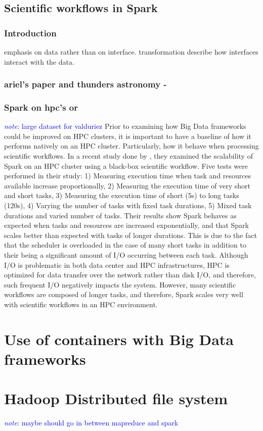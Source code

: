 \documentclass{report}
\newcommand{\note}[1]{\textcolor{blue}{\textit{note}: #1}}
\begin{document}
    \subsection{Scientific workflows in Spark} \subsubsection{Introduction}
    emphasis on data rather than on interface. transformation describe how
    interfaces interact with the data.  \subsubsection{ariel's paper and
    thunders astronomy - } \subsubsection{Spark on hpc's or } \note{large
    dataset for valduriez} Prior to examining how Big Data frameworks could be
    improved on HPC clusters, it is important to have a baseline of how it
    performs natively on an HPC cluster.  Particularly, how it behave when
    processing scientific workflows. In a recent study done by \cite{valduriez},
    they examined the scalability of Spark on an HPC cluster using a black-box
    scientific workflow. Five tests were performed in their study: 1) Measuring
    execution time when task and resources available increase proportionally, 2)
    Measuring the execution time of very short and short tasks, 3) Measuring the
    execution time of short (5s) to long tasks (120s), 4) Varying the number of
    tasks with fixed task durations, 5) Mixed task durations and varied number
    of tasks. Their results show Spark behaves as expected when tasks and
    resources are increased exponentially, and that Spark scales better than
    expected with tasks of longer durations. This is due to the fact that the
    scheduler is overloaded in the case of many short tasks in addition to their
    being a significant amount of I/O occurring between each task. Although I/O
    is problematic in both data center and HPC infrastructures, HPC is optimized
    for data transfer over the network rather than disk I/O, and therefore, such
    frequent I/O negatively impacts the system. However, many scientific
    workflows are composed of longer tasks, and therefore, Spark scales very
    well with scientific workflows in an HPC environment.  \section{Use of
    containers with Big Data frameworks} \section{Hadoop Distributed file
    system} \note{maybe should go in between mapreduce and spark} 
\end{document}
